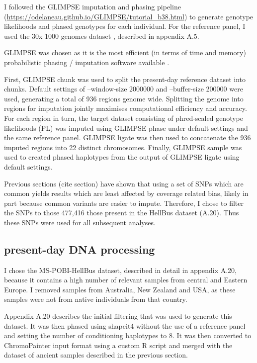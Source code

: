 I followed the GLIMPSE \cite{rubinacci2021efficient} imputation and phasing pipeline (\url{https://odelaneau.github.io/GLIMPSE/tutorial_b38.html}) to generate genotype likelihoods and phased genotypes for each individual. For the reference panel, I used the 30x 1000 genomes dataset \cite{byrska2021high}, described in appendix A.5.  

GLIMPSE was chosen as it is the most efficient (in terms of time and memory) probabilistic phasing / imputation software available \cite{rubinacci2021efficient}. 

First, GLIMPSE chunk was used to split the present-day reference dataset into chunks. Default settings of --window-size 2000000 and --buffer-size 200000 were used, generating a total of 936 regions genome wide. Splitting the genome into regions for imputation jointly maximises computational efficiency and accuracy. For each region in turn, the target dataset consisting of phred-scaled genotype likelihoods (PL) was imputed using GLIMPSE phase under default settings and the same reference panel. GLIMPSE ligate was then used to concatenate the 936 imputed regions into 22 distinct chromosomes. Finally, GLIMPSE sample was used to created phased haplotypes from the output of GLIMPSE ligate using default settings.

Previous sections (cite section) have shown that using a set of SNPs which are common yields results which are least affected by coverage related bias, likely in part because common variants are easier to impute. Therefore, I chose to filter the SNPs to those 477,416 those present in the HellBus dataset (A.20). Thus these SNPs were used for all subsequent analyses. 

\subsection{present-day DNA processing}

I chose the MS-POBI-HellBus dataset, described in detail in appendix A.20, because it contains a high number of relevant samples from central and Eastern Europe. I removed samples from Australia, New Zealand and USA, as these samples were not from native individuals from that country.  

Appendix A.20 describes the initial filtering that was used to generate this dataset. It was then phased using shapeit4 \cite{delaneau2018integrative} without the use of a reference panel and setting the number of conditioning haplotypes to 8. It was then converted to ChromoPainter input format using a custom R script and merged with the dataset of ancient samples described in the previous section.


